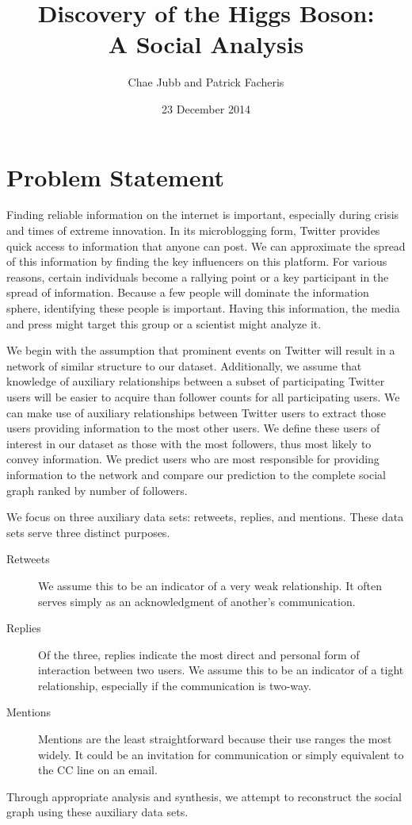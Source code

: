 \documentclass{sig-alternate-10pt}
\title{Discovery of the Higgs Boson:\\ A Social Analysis}
\author{
	Chae Jubb and Patrick Facheris \\
	\ttt{\{ecj2122,plf2110\}@columbia.edu}
}
\date{23 December 2014}
\begin{document}
\maketitle

\section{Problem Statement}
Finding reliable information on the internet is important, especially during crisis and times of extreme innovation.
In its microblogging form, Twitter provides quick access to information that anyone can post.
We can approximate the spread of this information by finding the key influencers on this platform.
For various reasons, certain individuals become a rallying point or a key participant in the spread of information.
Because a few people will dominate the information sphere, identifying these people is important.
Having this information, the media and press might target this group or a scientist might analyze it.

We begin with the assumption that prominent events on Twitter will result in a network of similar structure to our dataset. Additionally, we assume that knowledge of auxiliary relationships between a subset of participating Twitter users will be easier to acquire than follower counts for all participating users.
We can make use of auxiliary relationships between Twitter users to extract those users providing information to the most other users.
We define these users of interest in our dataset as those with the most followers, thus most likely to convey information.
We predict users who are most responsible for providing information to the network and compare our prediction to the complete social graph ranked by number of followers.

We focus on three auxiliary data sets: retweets, replies, and mentions.
These data sets serve three distinct purposes.
\begin{description}
\item [Retweets]
    We assume this to be an indicator of a very weak relationship.
    It often serves simply as an acknowledgment of another's communication.
\item [Replies]
    Of the three, replies indicate the most direct and personal form of interaction between two users.
    We assume this to be an indicator of a tight relationship, especially if the communication is two-way.
\item [Mentions]
    Mentions are the least straightforward because their use ranges the most widely.
    It could be an invitation for communication or simply equivalent to the CC line on an email.
\end{description}
Through appropriate analysis and synthesis, we attempt to reconstruct the social graph using these auxiliary data sets.
\end{document}
